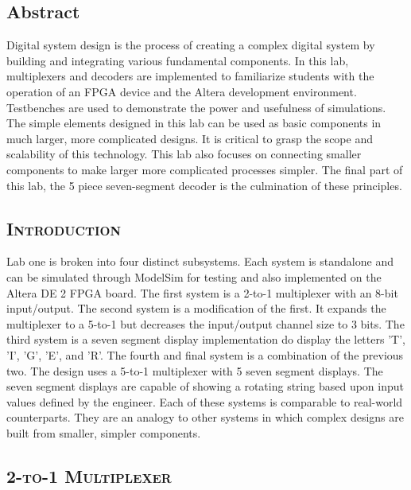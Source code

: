 \documentclass[11pt]{report}
\begin{document}
\begin{spacing}{1.5}
  \chapter*{Abstract}
  \label{cha:abstract}
\vspace{72pt}

Digital system design is the process of creating a complex digital system by building and integrating various fundamental components.  In this lab, multiplexers and decoders are implemented to familiarize students with the operation of an FPGA device and the Altera development environment.  Testbenches are used to demonstrate the power and usefulness of simulations.  The simple elements designed in this lab can be used as basic components in much larger, more complicated designs.  It is critical to grasp the scope and scalability of this technology.  This lab also focuses on connecting smaller components to make larger more complicated processes simpler.  The final part of this lab, the 5 piece seven-segment decoder is the culmination of these principles.

\clearpage

\section*{\scshape Introduction} %
\label{cha:introduction}

Lab one is broken into four distinct subsystems.  Each system is standalone and can be simulated through ModelSim for testing and also implemented on the Altera DE 2 FPGA board.  The first system is a 2-to-1 multiplexer with an 8-bit input/output.  The second system is a modification of the first.  It expands the multiplexer to a 5-to-1 but decreases the input/output channel size to 3 bits.  The third system is a seven segment display implementation do display the letters 'T', 'I', 'G', 'E', and 'R'.  The fourth and final system is a combination of the previous two.  The design uses a 5-to-1 multiplexer with 5 seven segment displays.  The seven segment displays are capable of showing a rotating string based upon input values defined by the engineer.  Each of these systems is comparable to real-world counterparts.  They are an analogy to other systems in which complex designs are built from smaller, simpler components.

\section{\scshape 2-to-1 Multiplexer} %
\label{sec:2to1}


\end{spacing}
\end{document}
